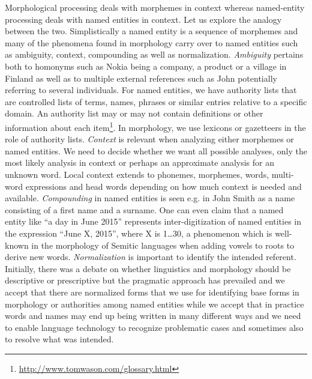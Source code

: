 \documentclass{llncs}
\begin{document}
Morphological processing deals with morphemes in context whereas
named-entity processing deals with named entities in context. Let us
explore the analogy between the two. Simplistically a named entity is
a sequence of morphemes and many of the phenomena found in morphology
carry over to named entities such as ambiguity, context, compounding
as well as normalization. \emph{Ambiguity} pertains both to homonyms such as
Nokia being a company, a product or a village in Finland as well as to
multiple external references such as John potentially referring to several
individuals. For named entities, we have authority lists that are
controlled lists of terms, names, phrases or similar entries relative
to a specific domain. An authority list may or may not contain
definitions or other information about each
item\footnote{\url{http://www.tomwason.com/glossary.html}}. In
morphology, we use lexicons or gazetteers in the role of authority lists.  
\emph{Context} is relevant
when analyzing either morphemes or named entities. We need to decide
whether we want all possible analyses, only the most likely analysis
in context or perhaps an approximate analysis for an unknown
word. Local context extends to phonemes, morphemes, words, multi-word
expressions and head words depending on how much context is needed and
available. \emph{Compounding} in named entities is seen e.g. in John Smith as
a name consisting of a first name and a surname. One can even claim
that a named entity like ``a day in June 2015'' represents
inter-digitization of named entities in the expression ``June X,
2015'', where X is 1\ldots30, a phenomenon which is well-known in the
morphology of Semitic languages when adding vowels to roots to derive
new words. \emph{Normalization} is important to identify the intended
referent. Initially, there was a debate on whether linguistics and
morphology should be descriptive or prescriptive but the pragmatic
approach has prevailed and we accept that there are normalized forms
that we use for identifying base forms in morphology or authorities
among named entities while we accept that in practice words and names
may end up being written in many different ways and we need to enable
language technology to recognize problematic cases and sometimes also
to resolve what was intended.
\end{document}
